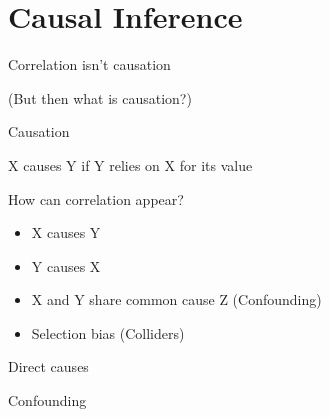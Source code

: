 \documentclass[aspectratio=169,xcolor=svgnames]{beamer}
\begin{document}
\section{Causal Inference}

\begin{frame}
  \center
  \huge
  Correlation isn't causation

  \footnotesize
  (But then what is causation?)
\end{frame}

\begin{frame}
  \center
  \huge
  Causation

  \small
  X causes Y if Y relies on X for its value
\end{frame}

\begin{frame}
  How can correlation appear?
  \begin{itemize}
  \item X causes Y
  \item Y causes X
  \item X and Y share common cause Z (Confounding)
  \item Selection bias (Colliders)
  \end{itemize}
\end{frame}

\begin{frame}
  \center
  \huge
  Direct causes


\end{frame}

\begin{frame}{Confounding}
  \center
\end{frame}
\end{document}
